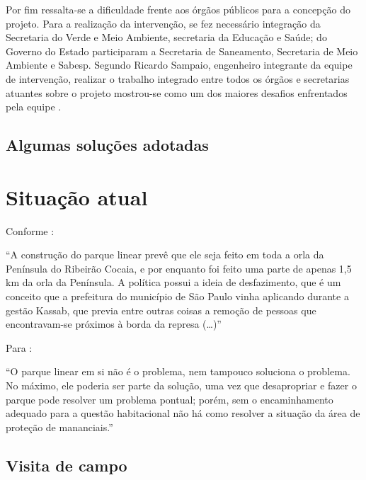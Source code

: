 	Por fim ressalta-se a dificuldade frente aos órgãos públicos para a concepção do projeto. Para a realização da intervenção, se fez necessário integração da Secretaria do Verde e Meio Ambiente, secretaria da Educação e Saúde; do Governo do Estado participaram a Secretaria de Saneamento, Secretaria de Meio Ambiente e Sabesp. Segundo Ricardo Sampaio, engenheiro integrante da equipe de intervenção, realizar o trabalho integrado entre todos os órgãos e secretarias atuantes sobre o projeto mostrou-se como um dos maiores desafios enfrentados pela equipe \cite{Barda2012}.
	
	\section{Algumas soluções adotadas}
	
	\chapter{Situação atual}
	
	Conforme :
	
	\begin{citacao}
	    ``A construção do parque linear prevê que ele seja feito em toda a orla da Península do Ribeirão Cocaia, e por enquanto foi feito uma parte de apenas 1,5 km da orla da Península. A política possui a ideia de desfazimento, que é um conceito que a prefeitura do município de São Paulo vinha aplicando durante a gestão Kassab, que previa entre outras coisas a remoção de pessoas que encontravam-se próximos à borda da represa (\dots)''
    \end{citacao}
	
	Para :
	
	\begin{citacao}
	   ``O parque linear em si não é o problema, nem tampouco soluciona o problema. No máximo, ele poderia ser parte da solução, uma vez que desapropriar e fazer o parque pode resolver um problema pontual; porém, sem o encaminhamento adequado para a questão habitacional não há como resolver a situação da área de proteção de mananciais.''
	\end{citacao}
	
	\section{Visita de campo}
	
	
